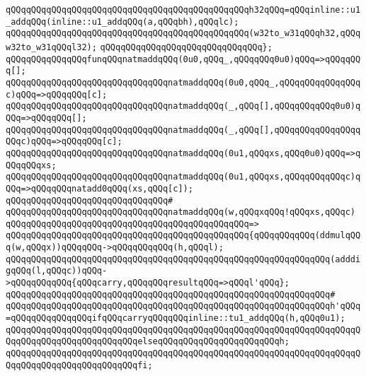 \verb|qQQqqQQqqQQqqQQqqQQqqQQqqQQqqQQqqQQqqQQqqQQqqQQqh32qQQq=qQQqinline::u1_addqQQq(inline::u1_addqQQq(a,qQQqbh),qQQqlc);|\newline
\newline
\verb|qQQqqQQqqQQqqQQqqQQqqQQqqQQqqQQqqQQqqQQqqQQqqQQq(w32to_w31qQQqh32,qQQqw32to_w31qQQql32);|\newline
\verb|qQQqqQQqqQQqqQQqqQQqqQQqqQQqqQQq};|\newline
\newline
\verb|qQQqqQQqqQQqqQQqfunqQQqnatmaddqQQq(0u0,qQQq_,qQQqqQQq0u0)qQQq=>qQQqqQQq[];|\newline
\verb|qQQqqQQqqQQqqQQqqQQqqQQqqQQqqQQqnatmaddqQQq(0u0,qQQq_,qQQqqQQqqQQqqQQqc)qQQq=>qQQqqQQq[c];|\newline
\verb|qQQqqQQqqQQqqQQqqQQqqQQqqQQqqQQqnatmaddqQQq(_,qQQq[],qQQqqQQqqQQq0u0)qQQq=>qQQqqQQq[];|\newline
\verb|qQQqqQQqqQQqqQQqqQQqqQQqqQQqqQQqnatmaddqQQq(_,qQQq[],qQQqqQQqqQQqqQQqqQQqc)qQQq=>qQQqqQQq[c];|\newline
\verb|qQQqqQQqqQQqqQQqqQQqqQQqqQQqqQQqnatmaddqQQq(0u1,qQQqxs,qQQq0u0)qQQq=>qQQqqQQqxs;|\newline
\verb|qQQqqQQqqQQqqQQqqQQqqQQqqQQqqQQqnatmaddqQQq(0u1,qQQqxs,qQQqqQQqqQQqc)qQQq=>qQQqqQQqnatadd0qQQq(xs,qQQq[c]);|\newline
\verb|qQQqqQQqqQQqqQQqqQQqqQQqqQQqqQQq#|\newline
\verb|qQQqqQQqqQQqqQQqqQQqqQQqqQQqqQQqnatmaddqQQq(w,qQQqxqQQq!qQQqxs,qQQqc)|\newline
\verb|qQQqqQQqqQQqqQQqqQQqqQQqqQQqqQQqqQQqqQQqqQQqqQQq=>|\newline
\verb|qQQqqQQqqQQqqQQqqQQqqQQqqQQqqQQqqQQqqQQqqQQqqQQq{qQQqqQQqqQQq(ddmulqQQq(w,qQQqx))qQQqqQQq->qQQqqQQqqQQq(h,qQQql);|\newline
\verb|qQQqqQQqqQQqqQQqqQQqqQQqqQQqqQQqqQQqqQQqqQQqqQQqqQQqqQQqqQQqqQQq(adddigqQQq(l,qQQqc))qQQq->qQQqqQQqqQQq{qQQqcarry,qQQqqQQqresultqQQq=>qQQql'qQQq};|\newline
\verb|qQQqqQQqqQQqqQQqqQQqqQQqqQQqqQQqqQQqqQQqqQQqqQQqqQQqqQQqqQQqqQQq#|\newline
\verb|qQQqqQQqqQQqqQQqqQQqqQQqqQQqqQQqqQQqqQQqqQQqqQQqqQQqqQQqqQQqqQQqh'qQQq=qQQqqQQqqQQqqQQqifqQQqcarryqQQqqQQqinline::tu1_addqQQq(h,qQQq0u1);|\newline
\verb|qQQqqQQqqQQqqQQqqQQqqQQqqQQqqQQqqQQqqQQqqQQqqQQqqQQqqQQqqQQqqQQqqQQqqQQqqQQqqQQqqQQqqQQqqQQqqQQqelseqQQqqQQqqQQqqQQqqQQqqQQqh;|\newline
\verb|qQQqqQQqqQQqqQQqqQQqqQQqqQQqqQQqqQQqqQQqqQQqqQQqqQQqqQQqqQQqqQQqqQQqqQQqqQQqqQQqqQQqqQQqqQQqqQQqfi;|\newline
